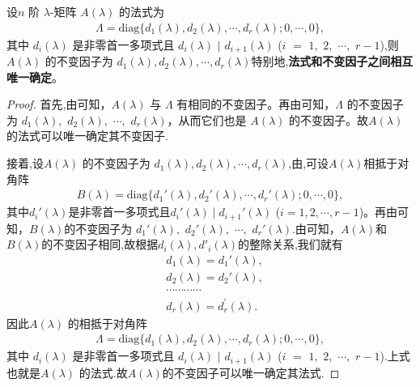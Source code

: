 \documentclass[../../main.tex]{subfiles}
\begin{document}
\begin{corollary}\label{corollary:不变因子和法式相互唯一确定}
设$n$ 阶 $\lambda$-矩阵 $A(\lambda)$ 的法式为
\begin{align*}
\varLambda=\mathrm{diag}\{d_1(\lambda),d_2(\lambda),\cdots,d_r(\lambda);0,\cdots,0\},
\end{align*}
其中 $d_i(\lambda)$ 是非零首一多项式且 $d_i(\lambda)$ $\mid$ $ d_{i + 1}(\lambda)$ ($i$ $=$ $1,$ $2,$ $\cdots,$ $r - 1$),则 $A(\lambda)$ 的不变因子为 $d_1(\lambda),d_2(\lambda),\cdots,d_r(\lambda)$特别地,\textbf{法式和不变因子之间相互唯一确定}。
\end{corollary}
\begin{proof}
首先,由可知，$A(\lambda)$ 与 $\varLambda$ 有相同的不变因子。再由可知，$\varLambda$ 的不变因子为 $d_1(\lambda),$ $d_2(\lambda),$ $\cdots,$ $d_r(\lambda)$，从而它们也是 $A(\lambda)$ 的不变因子。故$A(\lambda)$的法式可以唯一确定其不变因子.

接着,设$A(\lambda)$ 的不变因子为 $d_1(\lambda),d_2(\lambda),\cdots,d_r(\lambda)$,由,可设$A(\lambda)$相抵于对角阵
\begin{align}
B(\lambda)=\mathrm{diag}\{d_1'(\lambda),d_2'(\lambda),\cdots,d_r'(\lambda);0,\cdots,0\},
\end{align}
其中$d_i'(\lambda)$是非零首一多项式且$d_i'(\lambda)\mid d_{i + 1}'(\lambda)$ ($i = 1,2,\cdots,r - 1$)。再由可知，$B(\lambda)$的不变因子为 $d_1'(\lambda),$ $d_2'(\lambda),$ $\cdots,$ $d_r'(\lambda)$.由可知，$A(\lambda)$和$B(\lambda)$的不变因子相同,故根据$d_i(\lambda),d'_i(\lambda)$的整除关系,我们就有
\begin{align*}
&d_1\left( \lambda \right) =d_1'(\lambda ),
\\
&d_2\left( \lambda \right) =d_2' (\lambda ),
\\
&\cdots \cdots \cdots \cdots 
\\
&d_r\left( \lambda \right) =d_{r}^{\prime}\left( \lambda \right) .
\end{align*}
因此$A(\lambda)$ 的相抵于对角阵
\begin{align*}
\varLambda=\mathrm{diag}\{d_1(\lambda),d_2(\lambda),\cdots,d_r(\lambda);0,\cdots,0\},
\end{align*}
其中 $d_i(\lambda)$ 是非零首一多项式且 $d_i(\lambda)$ $\mid$ $ d_{i + 1}(\lambda)$ ($i$ $=$ $1,$ $2,$ $\cdots,$ $r - 1$).上式也就是$A(\lambda)$ 的法式.故$A(\lambda)$的不变因子可以唯一确定其法式.
\end{proof}
\end{document}
